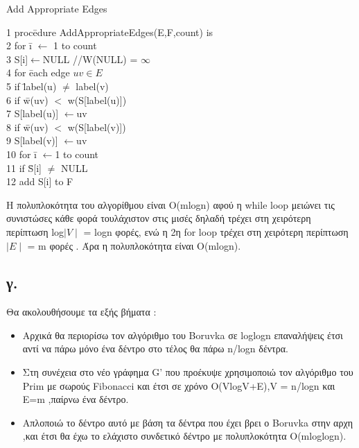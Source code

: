 \documentclass[12pt,a4paper]{article}
\begin{document}
\begin{mybox}{Add Appropriate Edges}
    \begin{tabbing}
1    proc\=edure AddAppropriateEdges(E,F,count) is \\
2    \>for \= i $\leftarrow$ 1 to count \\
3    \>\>S[i]$\leftarrow$NULL //W(NULL) = $\infty$ \\
4    \>for \=each edge $uv \in E$\\
5    \>\>if \=label(u) $\ne$ label(v)\\
6    \>\>\>if \=w(uv) $<$ w(S[label(u)])\\
7    \>\>\>\>S[label(u)] $\leftarrow$uv \\
8    \>\>\>if \=w(uv) $<$ w(S[label(v)])\\
9    \>\>\>\>S[label(v)] $\leftarrow$uv \\
10    \>for \=i $\leftarrow $1 to count \\
11    \>\> if \=S[i] $\ne$ NULL\\
12    \>\>\>add S[i] to F
    \end{tabbing}
        
\end{mybox}

Η πολυπλοκότητα του αλγορίθμου είναι Ο(mlogn) αφού η while loop μειώνει τις συνιστώσες κάθε φορά τουλάχιστον στις μισές δηλαδή τρέχει στη χειρότερη περίπτωση log$\mid V\mid$ = logn φορές, ενώ η 2η for loop τρέχει στη χειρότερη περίπτωση $\mid E \mid$ = m φορές . Άρα η πολυπλοκότητα είναι O(mlogn).
  
\subsection*{γ.}
Θα ακολουθήσουμε τα εξής βήματα :
\begin{itemize}
\item Αρχικά θα περιορίσω τον αλγόριθμο του Boruvka σε loglogn επαναλήψεις έτσι αντί να πάρω μόνο ένα δέντρο στο τέλος θα πάρω n/logn δέντρα.
\item Στη συνέχεια στο νέο γράφημα G' που προέκυψε χρησιμοποιώ τον αλγόριθμο του Prim με σωρούς Fibonacci και έτσι σε χρόνο Ο(VlogV+E),V = n/logn και E=m ,παίρνω ένα δέντρο.
\item Απλοποιώ το δέντρο αυτό με βάση τα δέντρα που έχει βρει ο Boruvka στην αρχη ,και έτσι θα έχω το ελάχιστο συνδετικό δέντρο με πολυπλοκότητα Ο(mloglogn).
\end{itemize}
\end{document}
